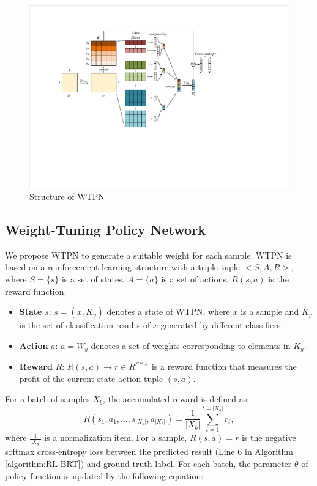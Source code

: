 \begin{figure}[tbp]
	\hspace{0ex}
	\vspace{0ex}
	\centering
	\includegraphics[width = \textwidth]{fig/WTPN}
	\caption{Structure of WTPN}
	\label{fig:WTPN}
\end{figure}

\subsection{Weight-Tuning Policy Network}
We propose WTPN to generate a suitable weight for each sample. WTPN is based on a reinforcement learning structure with a triple-tuple $<S, A, R>$, where $S = \{ s \}$ is a set of states. $A = \{ a \}$ is a set of actions. $R(s, a)$ is the reward function.
\begin{itemize}
	\item \textbf{State} $s$: $s = ( x, K_y )$ denotes a state of WTPN, where $x$ is a sample and $K_y$ is the set of classification results of $x$ generated by different classifiers.
	
	\item \textbf{Action} $a$: $a = W_y$ denotes a set of weights corresponding to elements in $K_y$.
	
	\item \textbf{Reward} $R$: $R(s, a) \to r \in R^{S * A}$ is a reward function that measures the profit of the current state-action tuple $(s, a)$.
\end{itemize}

For a batch of samples $X_b$, the accumulated reward is defined as:
\begin{equation}
R(s_1, a_1, ..., s_{|X_b|},a_{|X_b|}) = \frac{1}{|X_b|}\sum_{t = 1}^{t = |X_b|} r_t,
\end{equation}
where $ \frac{1}{|X_b|}$ is a normalization item. For a sample, $R(s,a) = r$ is the negative softmax cross-entropy loss between the predicted result (Line 6 in Algorithm \ref{algorithm:RL-BRT}) and ground-truth label.
For each batch, the parameter $\theta$ of policy function is updated by the following equation: 

